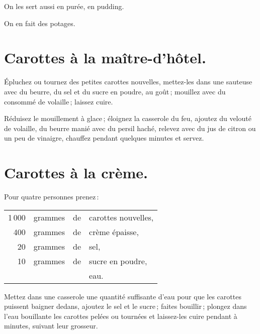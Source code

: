 On les sert aussi en purée, en pudding.

On en fait des potages.

\section*{\centering Carottes à la maître-d'hôtel.}
{}

Épluchez ou tournez des petites carottes nouvelles, mettez-les dans une
sauteuse avec du beurre, du sel et du sucre en poudre, au goût ; mouillez avec
du consommé de volaille ; laissez cuire.

Réduisez le mouillement à glace ; éloignez la casserole du feu, ajoutez du
velouté de volaille, du beurre manié avec du persil haché, relevez avec du jus
de citron ou un peu de vinaigre, chauffez pendant quelques minutes et servez.

\section*{\centering Carottes à la crème.}
{}

Pour quatre personnes prenez :

\footnotesize
\begin{longtable}{rrrp{16em}}
  1 000 & grammes & de & carottes nouvelles,                                                              \\
    400 & grammes & de & crème épaisse,                                                                   \\
     20 & grammes & de & sel,                                                                             \\
     10 & grammes & de & sucre en poudre,                                                                 \\
        &         &    & eau.                                                                             \\
\end{longtable}
\normalsize

Mettez dans une casserole une quantité suffisante d'eau pour que les carottes
puissent baigner dedans, ajoutez le sel et le sucre ; faites bouillir ; plongez
dans l'eau bouillante les carottes pelées ou tournées et laissez-les cuire
pendant {\mmm} à {\mmm} minutes, suivant leur grosseur.

